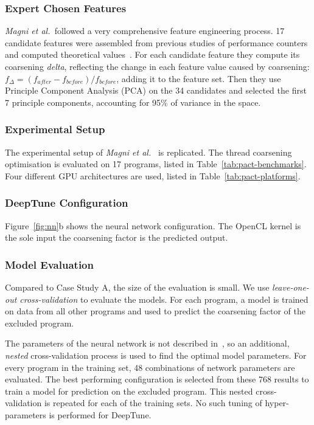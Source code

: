 



\subsubsection{Expert Chosen Features}

\emph{Magni et al.\ }followed a very comprehensive feature engineering process. 17 candidate features were assembled from previous studies of performance counters and computed theoretical values~\cite{Magni2,Sim2012}. For each candidate feature they compute its coarsening \emph{delta}, reflecting the change in each feature value caused by coarsening: $f_{\Delta} = (f_{after} - f_{before}) / f_{before}$, adding it to the feature set. Then they use Principle Component Analysis (PCA) on the 34 candidates and selected the first 7 principle components, accounting for 95\% of variance in the space.

\subsubsection{Experimental Setup}

The experimental setup of \emph{Magni et al.}~\cite{Magni2014} is replicated. The thread coarsening optimisation is evaluated on 17 programs, listed in Table~\ref{tab:pact-benchmarks}. Four different GPU architectures are used, listed in Table~\ref{tab:pact-platforms}.

\subsubsection{DeepTune Configuration}

Figure~\ref{fig:nn}b shows the neural network configuration. The OpenCL kernel is the sole input the coarsening factor is the predicted output.

\subsubsection{Model Evaluation}

Compared to Case Study A, the size of the evaluation is small. We use \emph{leave-one-out cross-validation} to evaluate the models. For each program, a model is trained on data from all other programs and used to predict the coarsening factor of the excluded program.

The parameters of the neural network is not described in~\cite{Magni2014}, so an additional, \emph{nested} cross-validation process is used to find the optimal model parameters. For every program in the training set, 48 combinations of network parameters are evaluated. The best performing configuration is selected from these 768 results to train a model for prediction on the excluded program. This nested cross-validation is repeated for each of the training sets. No such tuning of hyper-parameters is performed for DeepTune.


